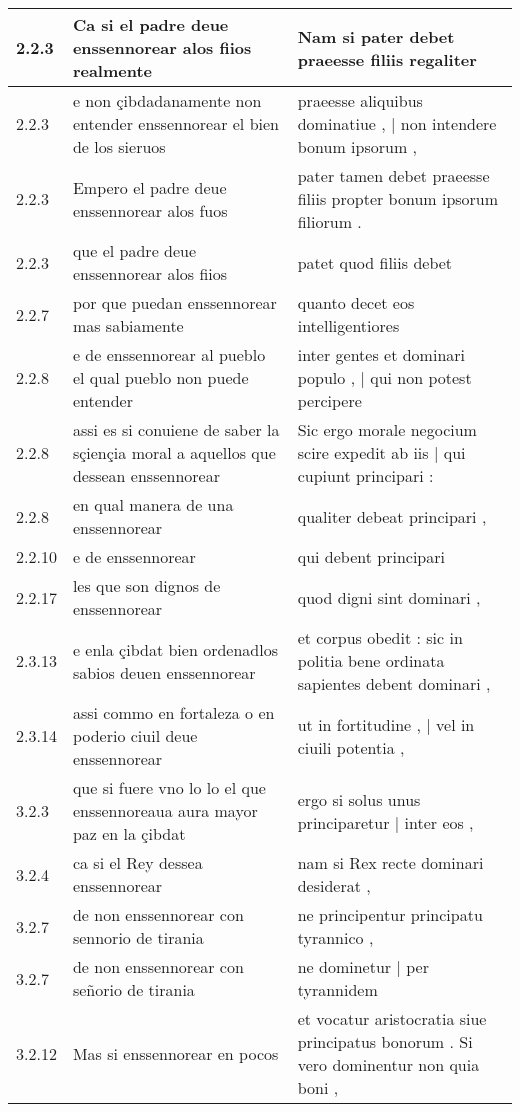 \begin{tabular}{|p{1cm}|p{6.5cm}|p{6.5cm}|}
2.2.3 & Ca si el padre deue enssennorear alos fiios realmente & Nam si pater debet praeesse filiis regaliter \\\hline
2.2.3 & e non çibdadanamente non entender enssennorear el bien de los sieruos & praeesse aliquibus dominatiue , | non intendere bonum ipsorum , \\\hline
2.2.3 & Empero el padre deue enssennorear alos fuos & pater tamen debet praeesse filiis propter bonum ipsorum filiorum . \\\hline
2.2.3 & que el padre deue enssennorear alos fiios & patet quod filiis debet \\\hline
2.2.7 & por que puedan enssennorear mas sabiamente & quanto decet eos intelligentiores \\\hline
2.2.8 & e de enssennorear al pueblo el qual pueblo non puede entender & inter gentes et dominari populo , | qui non potest percipere \\\hline
2.2.8 & assi es si conuiene de saber la sçiençia moral a aquellos que dessean enssennorear & Sic ergo morale negocium scire expedit ab iis | qui cupiunt principari : \\\hline
2.2.8 & en qual manera de una enssennorear & qualiter debeat principari , \\\hline
2.2.10 & e de enssennorear & qui debent principari \\\hline
2.2.17 & les que son dignos de enssennorear & quod digni sint dominari , \\\hline
2.3.13 & e enla çibdat bien ordenadlos sabios deuen enssennorear & et corpus obedit : sic in politia bene ordinata sapientes debent dominari , \\\hline
2.3.14 & assi commo en fortaleza o en poderio ciuil deue enssennorear & ut in fortitudine , | vel in ciuili potentia , \\\hline
3.2.3 & que si fuere vno lo lo el que enssennoreaua aura mayor paz en la çibdat & ergo si solus unus principaretur | inter eos , \\\hline
3.2.4 & ca si el Rey dessea enssennorear & nam si Rex recte dominari desiderat , \\\hline
3.2.7 & de non enssennorear con sennorio de tirania & ne principentur principatu tyrannico , \\\hline
3.2.7 & de non enssennorear con señorio de tirania & ne dominetur | per tyrannidem \\\hline
3.2.12 & Mas si enssennorear en pocos & et vocatur aristocratia siue principatus bonorum . Si vero dominentur non quia boni , \\\hline

\end{tabular}
